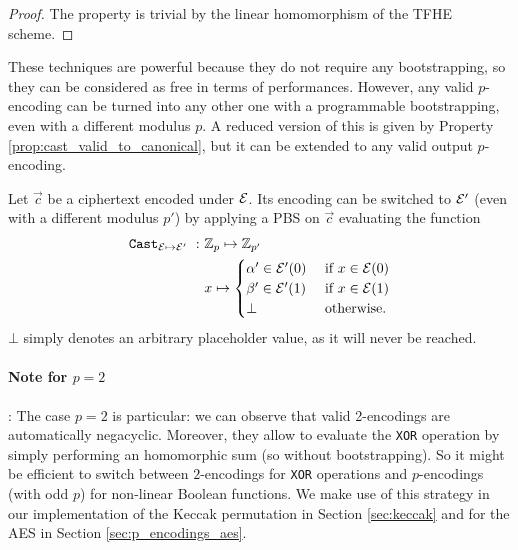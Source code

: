 \begin{proof}
    The property is trivial by the linear homomorphism of the \gls{TFHE} scheme.
\end{proof} 

These techniques are powerful because they do not require any bootstrapping, so they can be considered as free in terms of performances. However, any valid $p$-encoding can be turned into any other one with a programmable bootstrapping, even with a different modulus $p$. A reduced version of this is given by Property \ref{prop:cast_valid_to_canonical}, but it can be extended to any valid output $p$-encoding.

\begin{property} 
    Let $\vec c$ be a ciphertext encoded under $\mathcal{E}$. Its encoding can be switched to $\mathcal{E}'$ (even with a different modulus $p'$) by applying a \gls{PBS} on $\vec c$ evaluating the function     \begin{align}
        \texttt{Cast}_{\mathcal{E} \mapsto \mathcal{E}'}~:~& \mathbb{Z}_p \mapsto \mathbb{Z}_{p'}\\
        & x \mapsto \begin{cases}
                        \alpha' \in \mathcal{E}'(0) & \text{ if } x \in \mathcal{E}(0)\\
                        \beta' \in \mathcal{E}'(1) & \text{ if } x \in \mathcal{E}(1)\\
                        \bot & \text{ otherwise.}
                    \end{cases}
    \end{align}
    $\bot$ simply denotes an arbitrary placeholder value, as it will never be reached.
    \label{prop:enc_switch_pbs}
\end{property} 


\paragraph{Note for $p = 2$}: The case $p = 2$ is particular: we can observe that valid 2-encodings are automatically negacyclic. Moreover, they allow to evaluate the \texttt{XOR} operation by simply performing an homomorphic sum (so without bootstrapping). So it might be efficient to switch between $2$-encodings for \texttt{XOR} operations and $p$-encodings (with odd $p$) for non-linear Boolean functions. We make use
of this strategy in our implementation of the Keccak permutation in Section \ref{sec:keccak} and for
the \gls{AES} in Section \ref{sec:p_encodings_aes}.



